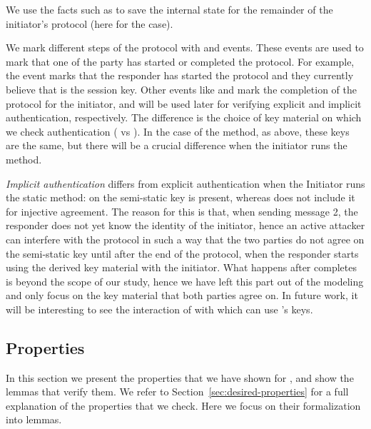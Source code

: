 We use the facts such as  %
to save the internal state for the remainder of the initiator's protocol (here
for the \mPskPsk{} case).

We mark different steps of the protocol with  and 
events. These events are used to mark that one of the party has started or
completed the protocol.
%
For example, the event  %
marks that the responder has started the protocol and they currently believe
that  is the session key.
%
Other events like  %
and  mark the completion of the protocol for
the initiator, and will be used later for verifying explicit and implicit
authentication, respectively.  The difference is the choice of key material on
which we check authentication ( vs ). In the case of the
\mSig{} method, as above, these keys are the same, but there will be a crucial
difference when the initiator runs the \mStat{} method.

\emph{Implicit authentication} differs from explicit authentication when the
Initiator runs the static method: on  the semi-static key \mGiy{} is
present, whereas  does not include it for injective agreement.
%
The reason for this is that, when sending message 2, the responder does not yet
know the identity of the initiator, hence an active attacker can interfere with
the protocol in such a way that the two parties do not agree on the semi-static
key \mGiy{} until after the end of the protocol, when the responder starts using
the derived key material with the initiator.
%
What happens after \mEdhoc{} completes is beyond the scope of our study, hence
we have left this part out of the modeling and only focus on the key material
that both parties agree on.
%
In future work, it will be interesting to see the interaction of \mEdhoc{} with
\mOscore{} which can use \mEdhoc{}'s keys.

 
\subsection{Properties}
\label{sec:properties}
In this section we present the properties that we have shown for \mEdhoc, and
show the lemmas that verify them. We refer to
Section~\ref{sec:desired-properties} for a full explanation of the properties
that we check. Here we focus on their formalization into \mTamarin{} lemmas.

